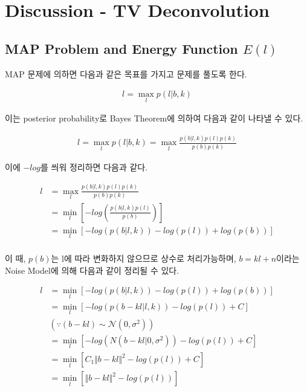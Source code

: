 \documentclass{report}
\begin{document}
\section*{Discussion - TV Deconvolution}

\subsection*{MAP Problem and Energy Function $E(l)$}

MAP 문제에 의하면 다음과 같은 목표를 가지고 문제를 풀도록 한다.

\begin{align*}
    l = \mathop{\max}\limits_{l} p(l | b, k)
\end{align*}

이는 posterior probability로 Bayes Theorem에 의하여 다음과 같이 나타낼 수 있다.

\begin{align*}
    l = \mathop{\max}\limits_{l} p(l | b, k) = \mathop{\max}\limits_{l} \frac{p(b | l, k)p(l)p(k)}{p(b)p(k)}
\end{align*}

이에 $-log$를 씌워 정리하면 다음과 같다.

\begin{align*}
    l &= \mathop{\max}\limits_{l} \frac{p(b | l, k)p(l)p(k)}{p(b)p(k)} \\
      &= \mathop{\min}\limits_{l} [-log(\frac{p(b | l, k)p(l)}{p(b)})] \\
      &= \mathop{\min}\limits_{l} [-log(p(b|l,k)) -log(p(l)) + log(p(b))] \\
\end{align*}

이 때, $p(b)$는 l에 따라 변화하지 않으므로 상수로 처리가능하며, $b=kl+n$이라는 Noise Model에 의해 다음과 같이 정리될 수 있다.

\begin{align*}
    l &= \mathop{\min}\limits_{l} [-log(p(b|l,k)) -log(p(l)) + log(p(b))] \\
      &= \mathop{\min}\limits_{l} [-log(p(b-kl|l,k)) -log(p(l)) + C] \\
      &(\because (b-kl) \sim \mathcal{N}(0,\sigma^2)) \\
      &= \mathop{\min}\limits_{l} [-log(N(b-kl|0,\sigma^2)) -log(p(l)) + C] \\
      &= \mathop{\min}\limits_{l} [C_1 \Vert b-kl \Vert ^2 -log(p(l)) + C] \\
      &= \mathop{\min}\limits_{l} [\Vert b-kl \Vert ^2 -log(p(l))]
\end{align*}
\end{document}
